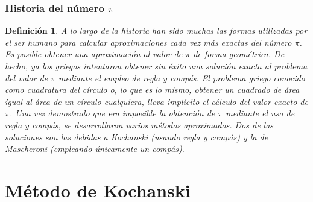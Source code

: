 \documentclass{beamer}
\newtheorem{definicion}{Definición}
\begin{document}
\begin{frame}

\frametitle{Historia del número $\pi$}

\begin{definicion}
A lo largo de la historia han sido muchas las formas utilizadas por el
ser humano para calcular aproximaciones cada vez más exactas del número $\pi$.
%
Es posible obtener una aproximación al valor de $\pi$ de forma geométrica.
De hecho, ya los griegos intentaron obtener sin éxito una solución exacta al 
problema del valor de $\pi$ mediante el empleo de regla y compás. 
El problema griego conocido como cuadratura del círculo o, lo que es lo mismo,
obtener un cuadrado de área igual al área de un círculo cualquiera, lleva implícito
el cálculo del valor exacto de $\pi$.
%
Una vez demostrado que era imposible la obtención de $\pi$ mediante el uso de regla 
y compás, se desarrollaron varios métodos aproximados. Dos de las soluciones son 
las debidas a Kochanski (usando regla y compás) y la de Mascheroni (empleando únicamente un compás).\par

\end{definicion}

\end{frame}

\section{Método de Kochanski}
\end{document}

